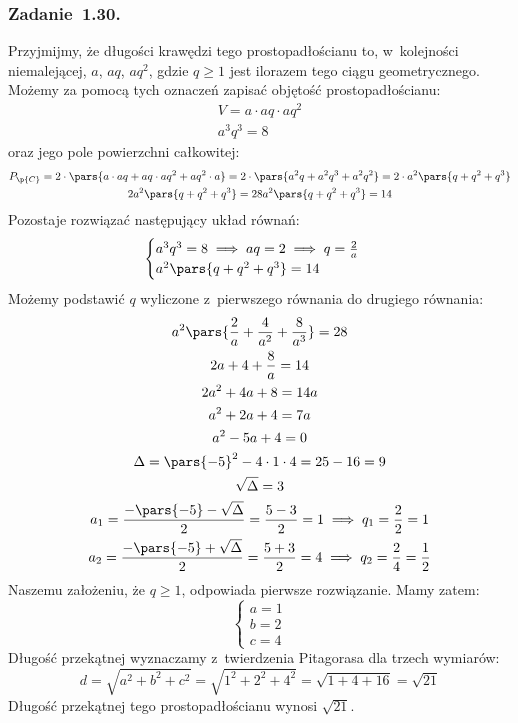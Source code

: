 \subsubsection*{Zadanie~1.30.}
Przyjmijmy, że długości krawędzi tego prostopadłościanu to, w~kolejności niemalejącej, \(a\), \(aq\), \(aq^2\), gdzie \(q \geq 1\) jest ilorazem tego ciągu geometrycznego. Możemy za pomocą tych oznaczeń zapisać objętość prostopadłościanu:
\begin{gather*}
    V = a \cdot aq \cdot aq^2\\
    a^3q^3 = 8
\end{gather*}
oraz jego pole powierzchni całkowitej:
\begin{gather*}
    P_\p{C}
    = 2 \cdot \pars{a \cdot aq + aq \cdot aq^2 + aq^2 \cdot a}
    = 2 \cdot \pars{a^2q + a^2q^3 + a^2q^2}
    = 2 \cdot a^2\pars{q + q^2 + q^3}\\
    2a^2\pars{q + q^2 + q^3} = 28
    a^2\pars{q + q^2 + q^3} = 14
\end{gather*}
Pozostaje rozwiązać następujący układ równań:
\begin{equation*}
    \begin{cases}
        a^3q^3 = 8 \implies aq = 2 \implies q = \frac{2}{a}\\
        a^2\pars{q + q^2 + q^3} = 14
    \end{cases}
\end{equation*}
Możemy podstawić \(q\) wyliczone z~pierwszego równania do drugiego równania:
\begin{gather*}
    a^2\pars{\frac{2}{a} + \frac{4}{a^2} + \frac{8}{a^3}} = 28\\
    2a + 4 + \frac{8}{a} = 14\\
    2a^2 + 4a + 8 = 14a\\
    a^2 + 2a + 4 = 7a\\
    a^2 - 5a + 4 = 0\\
    \Delta = \pars{-5}^2 - 4 \cdot 1 \cdot 4 = 25 - 16 = 9\\
    \sqrt{\Delta} = 3\\
    a_1 = \frac{-\pars{-5} - \sqrt{\Delta}}{2} = \frac{5 - 3}{2} = 1 \implies q_1 = \frac{2}{2} = 1\\
    a_2 = \frac{-\pars{-5} + \sqrt{\Delta}}{2} = \frac{5 + 3}{2} = 4 \implies q_2 = \frac{2}{4} = \frac{1}{2}
\end{gather*}
Naszemu założeniu, że \(q \geq 1\), odpowiada pierwsze rozwiązanie. Mamy zatem:
\begin{equation*}
    \begin{cases}
        a = 1\\
        b = 2\\
        c = 4
    \end{cases}
\end{equation*}
Długość przekątnej wyznaczamy z~twierdzenia Pitagorasa dla trzech wymiarów:
\begin{equation*}
    d = \sqrt{a^2 + b^2 + c^2}
    = \sqrt{1^2 + 2^2 + 4^2}
    = \sqrt{1 + 4 + 16}
    = \sqrt{21}
\end{equation*}
Długość przekątnej tego prostopadłościanu wynosi \(\sqrt{21}\).
